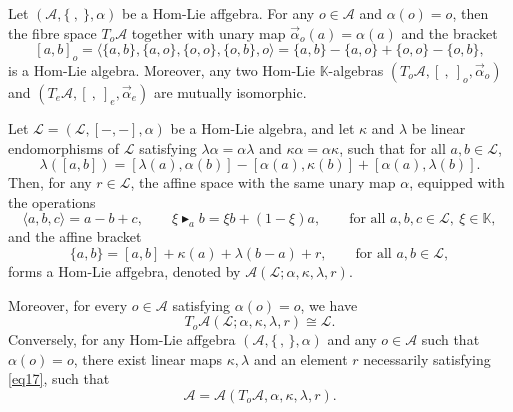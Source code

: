 \documentclass[10pt,a4paper]{amsart}
\begin{document}
\begin{Thm}\label{Thm10}
Let $(\mathcal{A},\{~,~\},\alpha)$ be a Hom-Lie affgebra. For any $o\in\mathcal{A}$ and $\alpha(o)=o$, then the fibre space $T_{o}\mathcal{A}$ together with unary map $\overrightarrow{\alpha}_{o}(a)=\alpha(a)$ and the bracket
\begin{equation}\label{eq20}
[a,b]_{o}=\langle \{a,b\},\{a,o\},\{o,o\},\{o,b\},o\rangle=\{a,b\}-\{a,o\}+\{o,o\}-\{o,b\},
\end{equation}
is a Hom-Lie algebra. Moreover, any two Hom-Lie $\mathbb{K}$-algebras $(T_{o}\mathcal{A},[~,~]_{o},\overrightarrow{\alpha}_{o})$ and $(T_{e}\mathcal{A},[~,~]_{e},\overrightarrow{\alpha}_{e})$ are mutually isomorphic.
\end{Thm}

\begin{Thm}\label{Thm6.4}
Let $\mathcal{L} = (\mathcal{L}, [-,-], \alpha)$ be a Hom-Lie algebra, and let $\kappa$ and $\lambda$ be linear endomorphisms of $\mathcal{L}$ satisfying $\lambda\alpha = \alpha\lambda$ and $\kappa\alpha = \alpha\kappa$, such that for all $a,b \in \mathcal{L}$,
\begin{equation}\label{eq17}
\lambda([a,b]) = [\lambda(a), \alpha(b)] - [\alpha(a), \kappa(b)] + [\alpha(a), \lambda(b)].
\end{equation}
Then, for any $r \in \mathcal{L}$, the affine space with the same unary map $\alpha$, equipped with the operations
\[
\langle a, b, c \rangle = a - b + c, \qquad 
\xi \blacktriangleright_{a} b = \xi b + (1 - \xi)a, \qquad 
\text{for all } a,b,c \in \mathcal{L},~ \xi \in \mathbb{K},
\]
and the affine bracket
\begin{equation}\label{eq18}
\{a,b\} = [a,b] + \kappa(a) + \lambda(b - a) + r, \qquad \text{for all } a,b \in \mathcal{L},
\end{equation}
forms a Hom-Lie affgebra, denoted by $\mathcal{A}(\mathcal{L}; \alpha, \kappa, \lambda, r)$.

Moreover, for every $o \in \mathcal{A}$ satisfying $\alpha(o) = o$, we have
\[
T_{o}\mathcal{A}(\mathcal{L}; \alpha, \kappa, \lambda, r) \cong \mathcal{L}.
\]
Conversely, for any Hom-Lie affgebra $(\mathcal{A}, \{\, , \,\}, \alpha)$ and any $o \in \mathcal{A}$ such that $\alpha(o) = o$, there exist linear maps $\kappa, \lambda$ and an element $r$ necessarily satisfying \eqref{eq17}, such that
\[
\mathcal{A} = \mathcal{A}(T_{o}\mathcal{A}, \alpha, \kappa, \lambda, r).
\]
\end{Thm}
\end{document}

